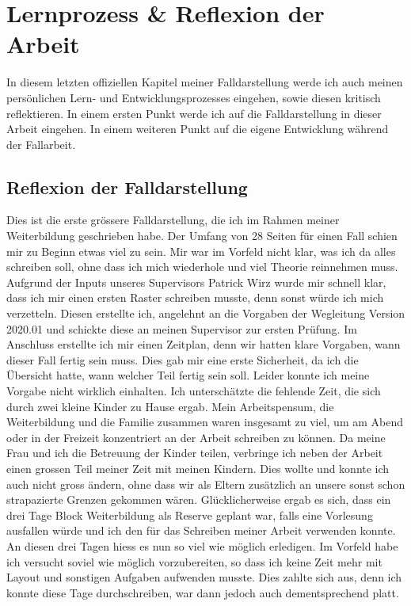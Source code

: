 \section{Lernprozess \& Reflexion der Arbeit}\label{Reflexion}
In diesem letzten offiziellen Kapitel meiner Falldarstellung werde ich auch meinen persönlichen Lern- und Entwicklungsprozesses eingehen, sowie diesen kritisch reflektieren. In einem ersten Punkt werde ich auf die Falldarstellung in dieser Arbeit eingehen. In einem weiteren Punkt auf die eigene Entwicklung während der Fallarbeit.

\subsection{Reflexion der Falldarstellung} \label{sec:reflexionfalldarstellung}
Dies ist die erste grössere Falldarstellung, die ich im Rahmen meiner Weiterbildung geschrieben habe. Der Umfang von 28 Seiten für einen Fall schien mir zu Beginn etwas viel zu sein. Mir war im Vorfeld nicht klar, was ich da alles schreiben soll, ohne dass ich mich wiederhole und viel Theorie reinnehmen muss. Aufgrund der Inputs unseres Supervisors Patrick Wirz wurde mir schnell klar, dass ich mir einen ersten Raster schreiben musste, denn sonst würde ich mich verzetteln. Diesen erstellte ich, angelehnt an die Vorgaben der Wegleitung Version 2020.01 und schickte diese an meinen Supervisor zur ersten Prüfung. Im Anschluss erstellte ich mir einen Zeitplan, denn wir hatten klare Vorgaben, wann dieser Fall fertig sein muss. Dies gab mir eine erste Sicherheit, da ich die Übersicht hatte, wann welcher Teil fertig sein soll. Leider konnte ich meine Vorgabe nicht wirklich einhalten. Ich unterschätzte die fehlende Zeit, die sich durch zwei kleine Kinder zu Hause ergab. Mein Arbeitspensum, die Weiterbildung und die Familie zusammen waren insgesamt zu viel, um am Abend oder in der Freizeit konzentriert an der Arbeit schreiben zu können. Da meine Frau und ich die Betreuung der Kinder teilen, verbringe ich neben der Arbeit einen grossen Teil meiner Zeit mit meinen Kindern. Dies wollte und konnte ich auch nicht gross ändern, ohne dass wir als Eltern zusätzlich an unsere sonst schon strapazierte Grenzen gekommen wären. Glücklicherweise ergab es sich, dass ein drei Tage Block Weiterbildung als Reserve geplant war, falls eine Vorlesung ausfallen würde und ich den für das Schreiben meiner Arbeit verwenden konnte. An diesen drei Tagen hiess es nun so viel wie möglich erledigen. Im Vorfeld habe ich versucht soviel wie möglich vorzubereiten, so dass ich keine Zeit mehr mit Layout und sonstigen Aufgaben aufwenden musste. Dies zahlte sich aus, denn ich konnte diese Tage durchschreiben, war dann jedoch auch dementsprechend platt. 

